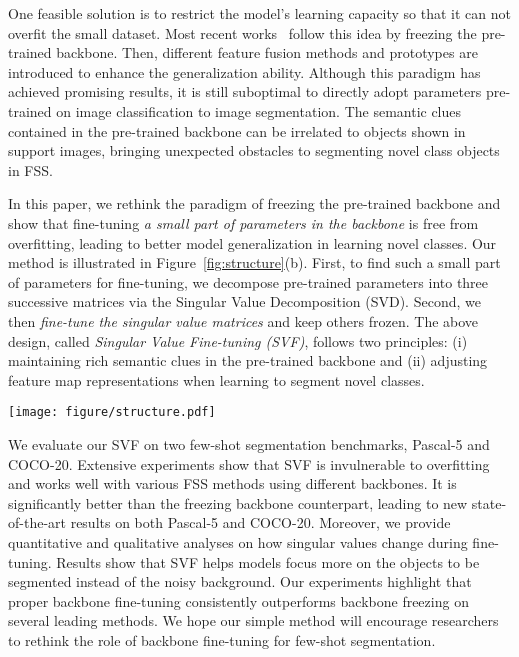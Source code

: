 \documentclass{article}
\begin{document}
One feasible solution is to restrict the model's learning capacity so that it can not overfit the small dataset. Most recent works~\cite{yang2021mining, zhang2021few, shen2021partial,TangLPT20} follow this idea by freezing the pre-trained backbone. Then, different feature fusion methods and prototypes are introduced to enhance the generalization ability. Although this paradigm has achieved promising results, it is still suboptimal to directly adopt parameters pre-trained on image classification to image segmentation. The semantic clues contained in the pre-trained backbone can be irrelated to objects shown in support images, bringing unexpected obstacles to segmenting novel class objects in FSS.

In this paper, we rethink the paradigm of freezing the pre-trained backbone and show that fine-tuning {\em a small part of parameters in the backbone} is free from overfitting, leading to better model generalization in learning novel classes. Our method is illustrated in Figure~\ref{fig:structure}(b). First, to find such a small part of parameters for fine-tuning, we decompose pre-trained parameters into three successive matrices via the Singular Value Decomposition (SVD). Second, we then {\em fine-tune the singular value matrices} and keep others frozen. The above design, called {\em Singular Value Fine-tuning (SVF)}, follows two principles: (i) maintaining rich semantic clues in the pre-trained backbone and (ii) adjusting feature map representations when learning to segment novel classes.

\begin{figure*}
	\centering
	\texttt{[image: figure/structure.pdf]}
	
	\caption{Previous paradigm \textit{vs.} SVF. (a) Previous paradigm introduces different segmentation heads based on the frozen pre-trained backbone. (b) SVF uses SVD to decompose the pre-trained parameters into three consecutive matrices, then only fine-tune the singular values and keep others frozen. Compared to the previous paradigm, SVF shows that fine-tuning a small part of parameters in the backbone is invulnerable to over-fitting, leading to better model generalization in learning novel classes.}
	\label{fig:structure}
	\vspace{-0.7cm}
\end{figure*}


We evaluate our SVF on two few-shot segmentation benchmarks, Pascal-5 and COCO-20. Extensive experiments show that SVF is invulnerable to overfitting and works well with various FSS methods using different backbones. It is significantly better than the freezing backbone counterpart, leading to new state-of-the-art results on both Pascal-5 and COCO-20. Moreover, we provide quantitative and qualitative analyses on how singular values change during fine-tuning. Results show that SVF helps models focus more on the objects to be segmented instead of the noisy background. Our experiments highlight that proper backbone fine-tuning consistently outperforms backbone freezing on several leading methods. We hope our simple method will encourage researchers to rethink the role of backbone fine-tuning for few-shot segmentation.
\end{document}
